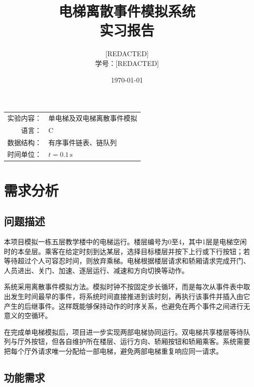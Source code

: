 \documentclass[UTF8,a4paper,12pt]{ctexart}
\title{\heiti 电梯离散事件模拟系统\\[0.5em]\Large 实习报告}
\author{[REDACTED]\\学号：[REDACTED]}
\date{\today}
\begin{document}
\maketitle
\thispagestyle{empty}
\vfill
\begin{center}
\begin{tabular}{rl}
实验内容：& 单电梯及双电梯离散事件模拟\\
语言：& C\\
数据结构：& 有序事件链表、链队列\\
时间单位：& $t=0.1\,\mathrm{s}$
\end{tabular}
\end{center}
\vfill
\clearpage

\tableofcontents
\clearpage

\section{需求分析}

\subsection{问题描述}

本项目模拟一栋五层教学楼中的电梯运行。楼层编号为0至4，其中1层是电梯空闲时的本垒层。乘客在给定时刻到达某层，选择目标楼层并按下上行或下行按钮；若等待超过个人可容忍时间，则放弃乘梯。电梯根据楼层请求和轿厢请求完成开门、人员进出、关门、加速、逐层运行、减速和方向切换等动作。

系统采用离散事件模拟方法。模拟时钟不按固定步长循环，而是每次从事件表中取出发生时间最早的事件，将系统时间直接推进到该时刻，再执行该事件并插入由它产生的后继事件。这样既能够保持动作的时序关系，也避免在两个事件之间进行无意义的空循环。

在完成单电梯模拟后，项目进一步实现两部电梯协同运行。双电梯共享楼层等待队列与厅外按钮，但各自维护所在楼层、运行方向、轿厢按钮和轿厢乘客。系统需要把每个厅外请求唯一分配给一部电梯，避免两部电梯重复响应同一请求。

\subsection{功能需求}
\end{document}
